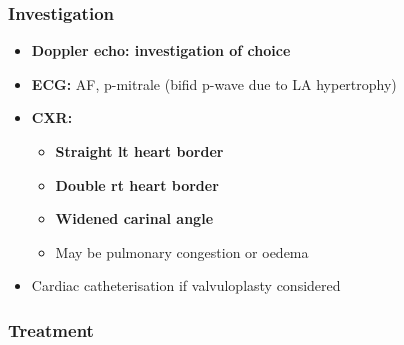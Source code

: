 \documentclass[
  12pt,
]{memoir}
\providecommand{\tightlist}{%
  \setlength{\itemsep}{0pt}\setlength{\parskip}{0pt}}
\begin{document}
\hypertarget{investigation-9}{%
\subsubsection{Investigation}\label{investigation-9}}

\begin{itemize}
\tightlist
\item
  \textbf{Doppler echo: investigation of choice}
\item
  \textbf{ECG:} AF, p-mitrale (bifid p-wave due to LA hypertrophy)
\item
  \textbf{CXR:}

  \begin{itemize}
  \tightlist
  \item
    \textbf{Straight lt heart border}
  \item
    \textbf{Double rt heart border}
  \item
    \textbf{Widened carinal angle}
  \item
    May be pulmonary congestion or oedema
  \end{itemize}
\item
  Cardiac catheterisation if valvuloplasty considered
\end{itemize}

\hypertarget{treatment-1}{%
\subsubsection{Treatment}\label{treatment-1}}
\end{document}
